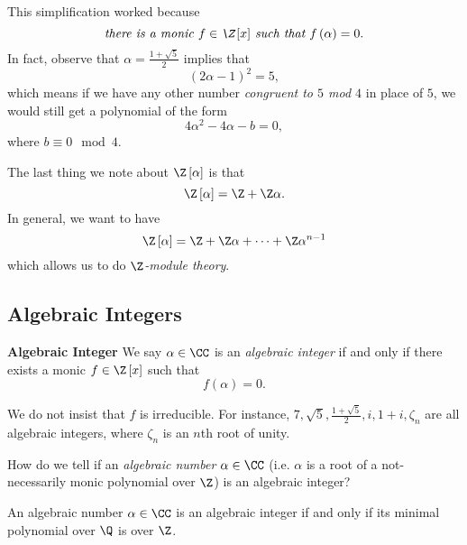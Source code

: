 \documentclass[pmath441]{subfiles}
\begin{document}
    This simplification worked because
    \begin{equation*}
        \text{\textit{there is a monic $f\in\Z\left[ x \right]$ such that $f\left( \alpha \right) = 0$}}.
    \end{equation*}
    In fact, observe that $\alpha = \frac{1+\sqrt{5}}{2}$ implies that
    \begin{equation*}
        \left( 2\alpha-1 \right)^{2} = 5,
    \end{equation*}
    which means if we have any other number \textit{congruent to $5$ mod $4$} in place of $5$, we would still get a polynomial of the form
    \begin{equation*}
        4\alpha^{2}-4\alpha-b = 0,
    \end{equation*}
    where $b\equiv 0\mod 4$.

    The last thing we note about $\Z\left[ \alpha \right]$ is that
    \begin{equation*}
        \Z\left[ \alpha \right] = \Z+\Z\alpha.
    \end{equation*}
    In general, we want to have
    \begin{equation*}
        \Z\left[ \alpha \right] = \Z+\Z\alpha+\cdots+\Z\alpha^{n-1}
    \end{equation*}
    which allows us to do \textit{$\Z$-module theory}.

    \subsection{Algebraic Integers}

    \begin{definition}{\textbf{Algebraic Integer}}
        We say $\alpha\in\CC$ is an \emph{algebraic integer} if and only if there exists a monic $f\in\Z\left[ x \right]$ such that
        \begin{equation*}
            f\left( \alpha \right) = 0.
        \end{equation*}
    \end{definition}

    We do not insist that $f$ is irreducible. For instance, $7, \sqrt{5}, \frac{1+\sqrt{5}}{2}, i, 1+i, \zeta_n$ are all algebraic integers, where $\zeta_n$ is an $n$th root of unity.

    How do we tell if an \textit{algebraic number} $\alpha\in\CC$ (i.e. $\alpha$ is a root of a not-necessarily monic polynomial over $\Z$) is an algebraic integer?
    
    \begin{theorem}{}
        An algebraic number $\alpha\in\CC$ is an algebraic integer if and only if its minimal polynomial over $\Q$ is over $\Z$.
    \end{theorem}
\end{document}
